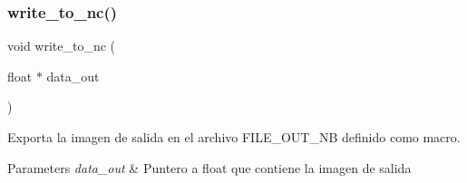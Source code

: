 \subsubsection{write\+\_\+to\+\_\+nc()}
{\footnotesize\ttfamily void write\+\_\+to\+\_\+nc (\begin{DoxyParamCaption}\item[{float $\ast$}]{data\+\_\+out }\end{DoxyParamCaption})}



Exporta la imagen de salida en el archivo F\+I\+L\+E\+\_\+\+O\+U\+T\+\_\+\+NB definido como macro. 


\begin{DoxyParams}{Parameters}
{\em data\+\_\+out} & Puntero a float que contiene la imagen de salida \\
\hline
\end{DoxyParams}
